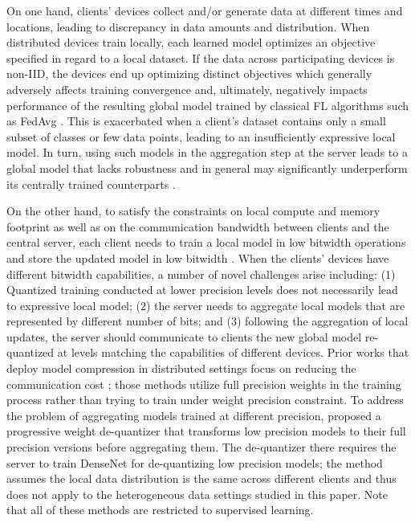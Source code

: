 On one hand, clients' devices collect and/or generate data at different times and locations, leading to discrepancy in data amounts and distribution. When distributed devices train locally, each learned model optimizes an objective specified in regard to a local dataset. If the data across participating devices is non-IID, the devices end up optimizing distinct objectives which generally adversely affects 
training convergence and, ultimately, negatively impacts performance of the resulting global model trained by classical FL algorithms such as FedAvg \cite{mcmahan2017communication, li2019convergence}. This is exacerbated when a client's dataset contains only a small subset of classes or few data points, leading to an insufficiently expressive local model. In turn, using such models in the aggregation step at the server leads to a global model that lacks robustness and in general may significantly underperform its centrally trained counterparts \cite{zhao2018federated}.

On the other hand, to satisfy the constraints on local compute and memory footprint as well as on the communication bandwidth between clients and the central server, each client needs to train a local model in low bitwidth operations and store the updated model in low bitwidth \cite{yoon2022bitwidth}. When the clients' devices have different bitwidth capabilities, a number of novel challenges arise including: (1) Quantized training conducted at lower precision levels does not necessarily lead to expressive local model; (2) the server needs to aggregate local models that are represented by different number of bits; and (3) following the aggregation of local updates, the server should communicate to clients the new global model re-quantized at levels matching the capabilities of different devices. Prior works that deploy model compression in distributed settings focus on reducing the communication cost \cite{reisizadeh2020fedpaq, chen2021communication, chen2021decentralized}; those methods utilize full precision weights in the training process rather than trying to train under weight precision constraint. To address the problem of aggregating models trained at different precision, \cite{yoon2022bitwidth} proposed a progressive weight de-quantizer that transforms low precision models to their full precision versions before aggregating them. The de-quantizer there requires the server to train DenseNet for de-quantizing low precision models; the method assumes the local data distribution is the same across different clients and thus does not apply to the heterogeneous data settings studied in this paper.
Note that all of these methods are restricted to supervised learning.

